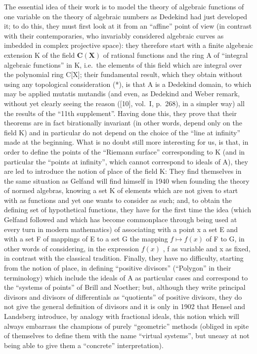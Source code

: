 The essential idea of their work is to model the theory of algebraic functions of one variable on the theory of algebraic numbers as Dedekind had just developed it; to do this, they must first look at it from an ``affine'' point of view (in contrast with their contemporaries, who invariably considered algebraic curves as imbedded in complex projective space): they therefore start with a finite algebraic extension K of the field \(\mathbf{C}(\mathbf{X})\) of rational functions and the ring A of ``integral algebraic functions'' in K, i.e.~the elements of this field which are integral over the polynomial ring C{[}X{]}; their fundamental result, which they obtain without using any topological consideration (*), is that A is a Dedekind domain, to which may be applied mutatis mutandis (and even, as Dedekind and Weber remark, without yet clearly seeing the reason ({[}10{]}, vol.~I, p.~268), in a simpler way) all the results of the ``11th supplement''. Having done this, they prove that their theorems are in fact birationally invariant (in other words, depend only on the field K) and in particular do not depend on the choice of the ``line at infinity'' made at the beginning. What is no doubt still more interesting for us, is that, in order to define the points of the ``Riemann surface'' corresponding to K (and in particular the ``points at infinity'', which cannot correspond to ideals of A), they are led to introduce the notion of place of the field K: They find themselves in the same situation as Gelfand will find himself in 1940 when founding the theory of normed algebras, knowing a set K of elements which are not given to start with as functions and yet one wants to consider as such; and, to obtain the defining set of hypothetical functions, they have for the first time the idea (which Gelfand followed and which has become commonplace through being used at every turn in modern mathematics) of associating with a point x a set E and with a set F of mappings of E to a set G the mapping \(f \mapsto f(x)\) of F to G, in other words of considering, in the expression \(f(x)\) , f as variable and x as fixed, in contrast with the classical tradition. Finally, they have no difficulty, starting from the notion of place, in defining ``positive divisors'' (``Polygon'' in their terminology) which include the ideals of A as particular cases and correspond to the ``systems of points'' of Brill and Noether; but, although they write principal divisors and divisors of differentials as ``quotients'' of positive divisors, they do not give the general definition of divisors and it is only in 1902 that Hensel and Landsberg introduce, by analogy with fractional ideals, this notion which will always embarrass the champions of purely ``geometric'' methods (obliged in spite of themselves to define them with the name ``virtual systems'', but uneasy at not being able to give them a ``concrete'' interpretation).

